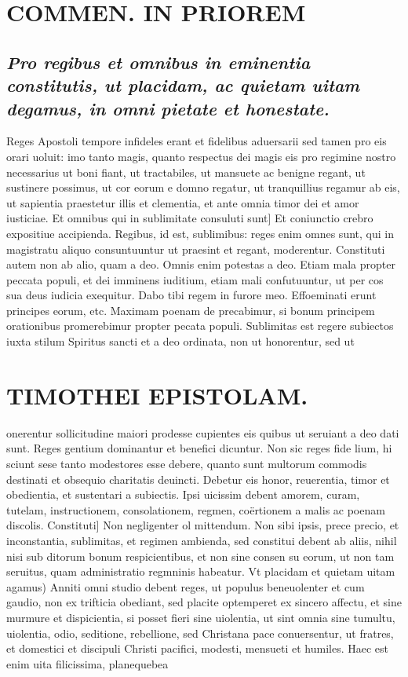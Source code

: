 \documentclass{article}
\begin{document}
\begin{pages}
\section*{COMMEN. IN PRIOREM }
\marginpar{[ p.44 ]}
{}
\subsection*{\textit{Pro regibus et omnibus in eminentia constitutis, ut placidam, ac quietam uitam degamus, in omni pietate et honestate. }}\pstart Reges Apostoli tempore infideles erant et fidelibus aduersarii sed tamen pro eis orari uoluit: imo tanto magis, quanto respectus dei magis eis pro regimine nostro necessarius ut boni fiant, ut tractabiles, ut mansuete ac benigne regant, ut sustinere possimus, ut cor eorum e domno regatur, ut tranquillius regamur ab eis, ut sapientia praestetur illis et clementia, et ante omnia timor dei et amor iusticiae.  \pend\pstart Et omnibus qui in sublimitate consuluti sunt] Et coniunctio crebro expositiue accipienda. Regibus, id est, sublimibus: reges enim omnes sunt, qui in magistratu aliquo consuntuuntur ut praesint et regant, moderentur. Constituti autem non ab alio, quam a deo. Omnis enim potestas a deo. Etiam mala propter peccata populi, et dei imminens iuditium, etiam mali confutuuntur, ut per cos sua deus iudicia exequitur. Dabo tibi regem in furore meo. Effoeminati erunt principes eorum, etc. Maximam poenam de precabimur, si bonum principem orationibus promerebimur propter pecata populi.  \pend\pstart Sublimitas est regere subiectos iuxta stilum Spiritus sancti et a deo ordinata, non ut honorentur, sed ut  \pend
\section*{TIMOTHEI EPISTOLAM. }
\marginpar{[ p.45 ]}\pstart onerentur sollicitudine maiori prodesse cupientes eis quibus ut seruiant a deo dati sunt. Reges gentium dominantur et benefici dicuntur. Non sic reges fide lium, hi sciunt sese tanto modestores esse debere, quanto sunt multorum commodis destinati et obsequio charitatis deuincti. Debetur eis honor, reuerentia, timor et obedientia, et sustentari a subiectis. Ipsi uicissim debent amorem, curam, tutelam, instructionem, consolationem, regmen, coërtionem a malis ac poenam discolis.  \pend\pstart Constituti] Non negligenter ol mittendum. Non sibi ipsis, prece precio, et inconstantia, sublimitas, et regimen ambienda, sed constitui debent ab aliis, nihil nisi sub ditorum bonum respicientibus, et non sine consen su eorum, ut non tam seruitus, quam administratio regmninis habeatur.  \pend\pstart Vt placidam et quietam uitam agamus) Anniti omni studio debent reges, ut populus beneuolenter et cum gaudio, non ex trifticia obediant, sed placite optemperet ex sincero affectu, et sine murmure et dispicientia, si posset fieri sine uiolentia, ut sint omnia sine tumultu, uiolentia, odio, seditione, rebellione, sed Christana pace conuersentur, ut fratres, et domestici et discipuli Christi pacifici, modesti, mensueti et humiles. Haec est enim uita filicissima, planequebea\pend

\end{pages}
\end{document}
